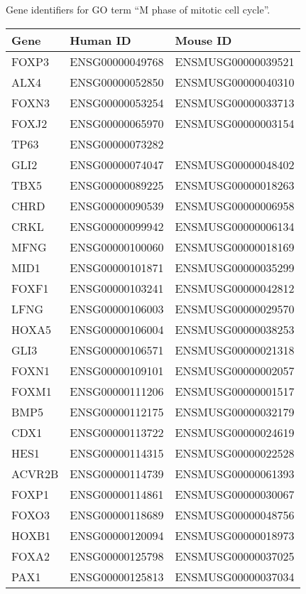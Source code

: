     {Gene identifiers for GO term “M phase of mitotic cell cycle”.}{}

\begin{longtable}{lll}
    \toprule
    Gene & Human ID & Mouse ID \\
    \midrule
    FOXP3 & ENSG00000049768 & ENSMUSG00000039521 \\
    ALX4 & ENSG00000052850 & ENSMUSG00000040310 \\
    FOXN3 & ENSG00000053254 & ENSMUSG00000033713 \\
    FOXJ2 & ENSG00000065970 & ENSMUSG00000003154 \\
    TP63 & ENSG00000073282 &  \\
    GLI2 & ENSG00000074047 & ENSMUSG00000048402 \\
    TBX5 & ENSG00000089225 & ENSMUSG00000018263 \\
    CHRD & ENSG00000090539 & ENSMUSG00000006958 \\
    CRKL & ENSG00000099942 & ENSMUSG00000006134 \\
    MFNG & ENSG00000100060 & ENSMUSG00000018169 \\
    MID1 & ENSG00000101871 & ENSMUSG00000035299 \\
    FOXF1 & ENSG00000103241 & ENSMUSG00000042812 \\
    LFNG & ENSG00000106003 & ENSMUSG00000029570 \\
    HOXA5 & ENSG00000106004 & ENSMUSG00000038253 \\
    GLI3 & ENSG00000106571 & ENSMUSG00000021318 \\
    FOXN1 & ENSG00000109101 & ENSMUSG00000002057 \\
    FOXM1 & ENSG00000111206 & ENSMUSG00000001517 \\
    BMP5 & ENSG00000112175 & ENSMUSG00000032179 \\
    CDX1 & ENSG00000113722 & ENSMUSG00000024619 \\
    HES1 & ENSG00000114315 & ENSMUSG00000022528 \\
    ACVR2B & ENSG00000114739 & ENSMUSG00000061393 \\
    FOXP1 & ENSG00000114861 & ENSMUSG00000030067 \\
    FOXO3 & ENSG00000118689 & ENSMUSG00000048756 \\
    HOXB1 & ENSG00000120094 & ENSMUSG00000018973 \\
    FOXA2 & ENSG00000125798 & ENSMUSG00000037025 \\
    PAX1 & ENSG00000125813 & ENSMUSG00000037034 \\

\end{longtable}
